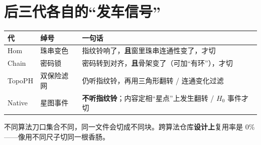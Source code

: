 \section{后三代各自的``发车信号''}

\begin{center}
\begin{tabular}{@{}llp{6.5cm}@{}}
\toprule
代 & 绰号 & 一句话 \\
\midrule
Hom & 珠串变色 & 指纹铃响了，\textbf{且}窗里珠串连通性变了，才切 \\
Chain & 密码锁 & 密码转到对齐，\textbf{且}骨架变了（可加``有环''），才切 \\
TopoPH & 双保险滤网 & 仍听指纹铃，再用三角形翻转 / 连通变化过滤 \\
Native & 星图事件 & \textbf{不听指纹铃}；内容定相``星点''上发生翻转 / $H_0$ 事件才切 \\
\bottomrule
\end{tabular}
\end{center}

\begin{pitfall}[仓库不能混切]
不同算法刀口集合不同，同一文件会切成不同块。跨算法仓库\textbf{设计上}复用率是 0\%——像用不同尺子切同一根香肠。
\end{pitfall}
